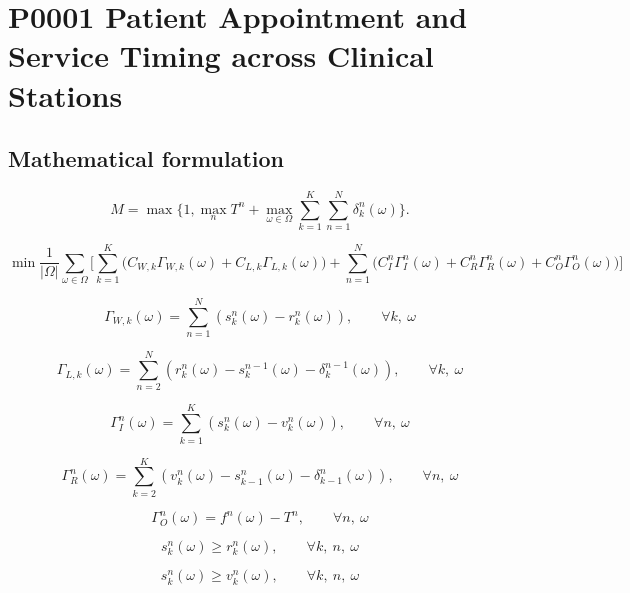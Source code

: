 \documentclass[10pt]{article}
\begin{document}
\section*{P0001 Patient Appointment and Service Timing across Clinical Stations}
\subsection*{Mathematical formulation}
\[
M=\max\{1,\max_nT^n+\max_{\omega\in\Omega}\sum_{k=1}^K\sum_{n=1}^N\delta_k^n(\omega)\}.
\]

\begin{equation}
\min
\frac{1}{|\Omega|} \sum_{\omega \in \Omega}
\Big[
\sum_{k=1}^{K}
\big(
C_{W,k}\Gamma_{W,k}(\omega) + C_{L,k}\Gamma_{L,k}(\omega)
\big)
+ \sum_{n=1}^{N}
\big(
C_I^n\Gamma_I^n(\omega) + C_R^n\Gamma_R^n(\omega) + C_O^n\Gamma_O^n(\omega)
\big)
\Big]
\tag{MILP}
\end{equation}

\begin{equation}
\Gamma_{W,k}(\omega) =
\sum_{n=1}^{N} \left( s_k^n(\omega) - r_k^n(\omega) \right),
\qquad \forall k,\ \omega
\tag{10a}
\end{equation}

\begin{equation}
\Gamma_{L,k}(\omega) =
\sum_{n=2}^{N} \left( r_k^n(\omega) - s_k^{n-1}(\omega) - \delta_k^{n-1}(\omega) \right),
\qquad \forall k,\ \omega
\tag{10b}
\end{equation}

\begin{equation}
\Gamma_I^n(\omega) =
\sum_{k=1}^{K} \left( s_k^n(\omega) - v_k^n(\omega) \right),
\qquad \forall n,\ \omega
\tag{10c}
\end{equation}

\begin{equation}
\Gamma_R^n(\omega) =
\sum_{k=2}^{K} \left( v_k^n(\omega) - s_{k-1}^n(\omega) - \delta_{k-1}^n(\omega) \right),
\qquad \forall n,\ \omega
\tag{10d}
\end{equation}

\begin{equation}
\Gamma_O^n(\omega) = f^n(\omega) - T^n,
\qquad \forall n,\ \omega
\tag{10e}
\end{equation}

\begin{equation}
s_k^n(\omega) \ge r_k^n(\omega),
\qquad \forall k,\ n,\ \omega
\tag{11}
\end{equation}

\begin{equation}
s_k^n(\omega) \ge v_k^n(\omega),
\qquad \forall k,\ n,\ \omega
\tag{12}
\end{equation}
\end{document}
